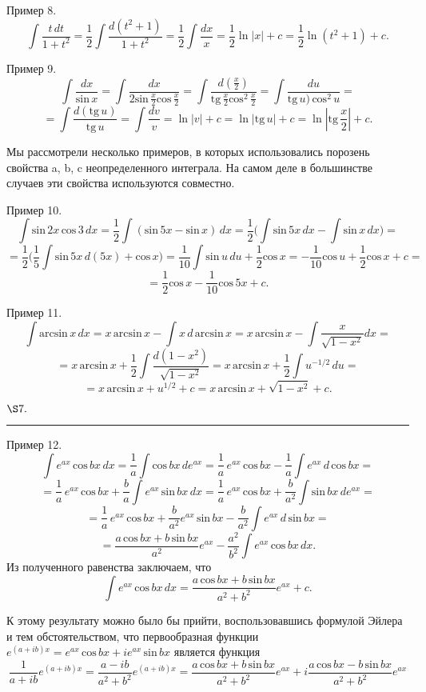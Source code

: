 \documentclass[a5paper,18pt]{book}
\begin{document}
\par Пример 8.
\[ \int \frac{t\, dt}{1+t^2} =\frac{1}{2}\int\frac{d(t^2+1)}{1+t^2}= \frac{1}{2}\int \frac{dx}{x}=\frac{1}{2}\ln{|x|}+c=\frac{1}{2}\ln{(t^2+1)}+c. \]
\par Пример 9.
\[\int \frac{dx}{\textrm{sin}\, x}=\int\frac{dx}{2\textrm{sin}\, \frac{x}{2}\textrm{cos}\, \frac{x}{2}}=\int\frac{d(\frac{x}{2})}{\textrm{tg}\, \frac{x}{2}\textrm{cos}^2\, \frac{x}{2}}=\int\frac{du}{\textrm{tg}\, u)\, \textrm{cos}^2\, u}=\]
\[=\int\frac{d(\textrm{tg}\, u)}{\textrm{tg}\, u}=\int\frac{dv}{v}=\ln{|v|}+c=\ln{|\textrm{tg}\, u|}+c=\ln{|\textrm{tg}\, \frac{x}{2}|}+c.\]
\par Мы рассмотрели несколько примеров, в которых использовались порозень свойства a, b, c неопределенного интеграла. На самом деле в большинстве случаев эти свойства используются совместно.
\par Пример 10.
\[\int \textrm{sin}\, 2x\, \textrm{cos}\, 3\, dx=  \frac{1}{2}\int (\textrm{sin}\, 5x - \textrm{sin}\, x)\, dx=\frac{1}{2} \Big(\int\textrm{sin}\, 5x\, dx - \int\textrm{sin}\, x\, dx \Big)= \]
\[=\frac{1}{2} \Big( \frac{1}{5} \int\textrm{sin}\, 5x\, d(5x)+\textrm{cos}\, x  \Big)=  \frac{1}{10} \int\textrm{sin}\, u\, du +\frac{1}{2}\textrm{cos}\, x=-\frac{1}{10}\textrm{cos}\, u+\frac{1}{2}\textrm{cos}\, x+c=\]
\[=\frac{1}{2}\textrm{cos}\, x-\frac{1}{10}\textrm{cos}\, 5x+c.\]
\par Пример 11.
\[\int\textrm{arcsin}\, x\, dx=x\, \textrm{arcsin}\, x - \int x\, d\, \textrm{arcsin}\, x=x\, \textrm{arcsin}\, x - \int\frac{x}{\sqrt{1-x^2 }}dx =  \]
\[=x\, \textrm{arcsin}\, x+ \frac{1}{2} \int\frac{d(1-x^2)}{\sqrt{1-x^2 }}=x\, \textrm{arcsin}\, x+\frac{1}{2} \int u^{-1/2}\, du= \]
\[=x\, \textrm{arcsin}\, x+  u^{1/2} +c= x\, \textrm{arcsin}\, x+  \sqrt{1-x^2 } +c.      \]
\newpage
 \begin{center}
      $\S7.$ 
      \par\noindent\rule{\textwidth}{1.1pt} %
  \end{center}
\par Пример 12.
\[\int e^{ax}\, \textrm{cos}\, bx\, dx=\frac{1}{a}\int\textrm{cos}\, bx\, de^{ax}=\frac{1}{a}\, e^{ax}\, \textrm{cos}\, bx  - \frac{1}{a} \int e^{ax}\, d\, \textrm{cos}\, bx =\]
\[=\frac{1}{a}\, e^{ax}\, \textrm{cos}\, bx +\frac{b}{a}\int e^{ax}\, \textrm{sin}\, bx\, dx =\frac{1}{a}\, e^{ax}\, \textrm{cos}\, bx +\frac{b}{a^2}\int\textrm{sin}\, bx\, de^{ax}=\]
\[=\frac{1}{a}\, e^{ax}\, \textrm{cos}\, bx +\frac{b}{a^2}e^{ax}\, \textrm{sin}\, bx-\frac{b}{a^2}\int e^{ax}\, d\, \textrm{sin}\, bx=\]
\[=\frac{a\, \textrm{cos}\, bx + b\, \textrm{sin}\, bx}{a^2}e^{ax} -\frac{a^2}{b^2}\int e^{ax}\, \textrm{cos}\, bx\, dx. \]
Из полученного равенства заключаем, что
\[\int e^{ax}\, \textrm{cos}\, bx\, dx=\frac{a\, \textrm{cos}\, bx + b\, \textrm{sin}\, bx}{a^2+b^2}e^{ax}+c.\]
\par К этому результату можно было бы прийти, воспользовавшись формулой Эйлера и тем обстоятельством, что первообразная функции $e^{(a+ib)x}=e^{ax}\, \textrm{cos}\, bx +ie^{ax}\, \textrm{sin}\, bx $ является функция
\[\frac{1}{a+ib}e^{(a+ib)x} =\frac{a-ib}{a^2+b^2}e^{(a+ib)x}=\frac{a\, \textrm{cos}\, bx + b\, \textrm{sin}\, bx}{a^2+b^2}e^{ax}+i\frac{a\, \textrm{cos}\, bx - b\, \textrm{sin}\, bx}{a^2+b^2}e^{ax}     \]
\end{document}
